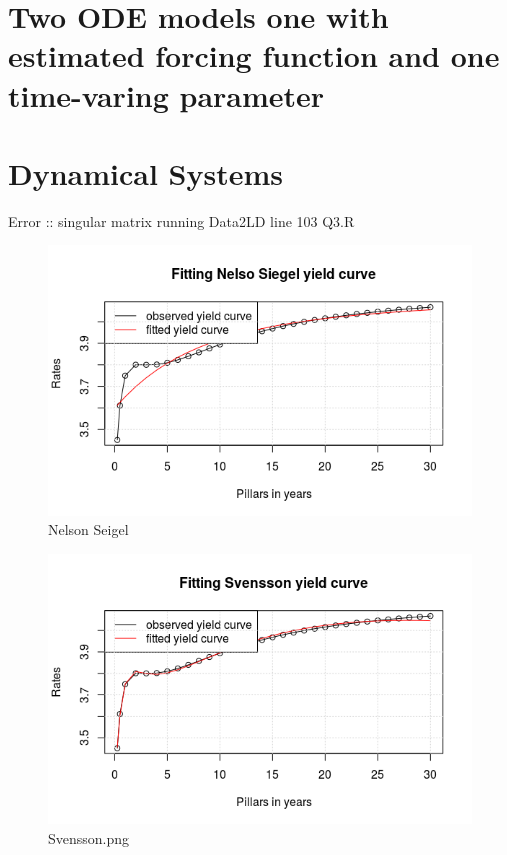 \documentclass[a4paper]{article}
\begin{document}
\section{Two ODE models one with estimated forcing function and one time-varing parameter}

\section{Dynamical Systems}
Error :: singular matrix running Data2LD line 103 Q3.R

\begin{appendix}
   \newpage
  \begin{figure}[H]
    \centering
    \includegraphics[width=1\textwidth]{NelsonSeigel.png}
    \caption{\label{fig:NelsonSeigel}Nelson Seigel}
  \end{figure}
  
  \begin{figure}[H]
    \centering
    \includegraphics[width=1\textwidth]{svensson.png}
    \caption{\label{fig:Svensson}Svensson.png}
  \end{figure}


\end{appendix}
\end{document}
